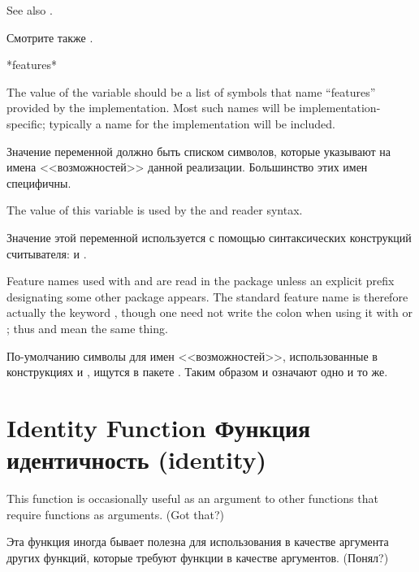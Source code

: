 \noindent
See also .

\noindent
Смотрите также .


\begin{defun}[Variable]
*features*

The value of the variable  should be a list of symbols
that name ``features'' provided by the implementation.
Most such names will be implementation-specific; typically
a name for the implementation will be included.

Значение переменной  должно быть списком символов, которые
указывают на имена <<возможностей>> данной реализации.
Большинство этих имен специфичны. 

The value of this variable is used by the \cd{\#+} and \cd{\#-}
reader syntax.

Значение этой переменной используется с помощью синтаксических конструкций считывателя: \cd{\#+} и \cd{\#-}.

Feature names used with \cd{\#+} and \cd{\#-}
are read in the  package unless an explicit prefix
designating some other package appears.  The standard
feature name  is therefore actually the
keyword , though one need not write the colon
when using it with \cd{\#+} or \cd{\#-}; thus 
and  mean the same thing.

По-умолчанию символы для имен <<возможностей>>, использованные в конструкциях
\cd{\#+} и \cd{\#-}, ищутся в пакете
. Таким образом 
и  означают одно и то же.
\end{defun}


\section{Identity Function Функция идентичность (identity)}

This function is occasionally useful as an argument to
other functions that require functions as arguments.  (Got that?)

Эта функция иногда бывает полезна для использования в качестве аргумента других
функций, которые требуют функции в качестве аргументов. (Понял?)

